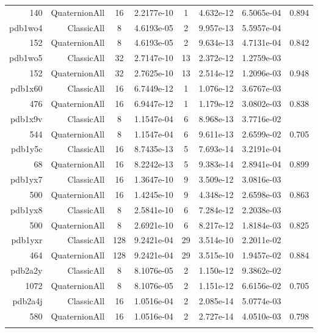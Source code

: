 \begin{xltabular}{\textwidth}{r|rcS[table-format=1.4e+2]cS[table-format=1.3e+2]S[table-format=1.4e+2]S[table-format=-1.3]}
140 & QuaternionAll & 16 & 2.2177e-10 & 1 & 4.632e-12 & 6.5065e-04 & 0.894\\  \addlinespace
pdb1wo4 & ClassicAll & 8 & 4.6193e-05 & 2 & 9.957e-13 & 5.5957e-04 & \\
152 & QuaternionAll & 8 & 4.6193e-05 & 2 & 9.634e-13 & 4.7131e-04 & 0.842\\  \addlinespace
pdb1wo5 & ClassicAll & 32 & 2.7147e-10 & 13 & 2.372e-12 & 1.2759e-03 & \\
152 & QuaternionAll & 32 & 2.7625e-10 & 13 & 2.514e-12 & 1.2096e-03 & 0.948\\  \addlinespace
pdb1x60 & ClassicAll & 16 & 6.7449e-12 & 1 & 1.076e-12 & 3.6767e-03 & \\
476 & QuaternionAll & 16 & 6.9447e-12 & 1 & 1.179e-12 & 3.0802e-03 & 0.838\\  \addlinespace
{\color{red} pdb1x9v } & ClassicAll & 8 & 1.1547e-04 & 6 & 8.968e-13 & 3.7716e-02 & \\
544 & QuaternionAll & 8 & 1.1547e-04 & 6 & 9.611e-13 & 2.6599e-02 & 0.705\\  \addlinespace
pdb1y5c & ClassicAll & 16 & 8.7435e-13 & 5 & 7.693e-14 & 3.2191e-04 & \\
68 & QuaternionAll & 16 & 8.2242e-13 & 5 & 9.383e-14 & 2.8941e-04 & 0.899\\  \addlinespace
pdb1yx7 & ClassicAll & 16 & 1.3647e-10 & 9 & 3.509e-12 & 3.0816e-03 & \\
500 & QuaternionAll & 16 & 1.4245e-10 & 9 & 4.348e-12 & 2.6598e-03 & 0.863\\  \addlinespace
pdb1yx8 & ClassicAll & 8 & 2.5841e-10 & 6 & 7.284e-12 & 2.2038e-03 & \\
500 & QuaternionAll & 8 & 2.6921e-10 & 6 & 8.217e-12 & 1.8184e-03 & 0.825\\  \addlinespace
pdb1yxr & ClassicAll & 128 & 9.2421e-04 & 29 & 3.514e-10 & 2.2011e-02 & \\
464 & QuaternionAll & 128 & 9.2421e-04 & 29 & 3.515e-10 & 1.9457e-02 & 0.884\\  \addlinespace
{\color{red} pdb2a2y } & ClassicAll & 8 & 8.1076e-05 & 2 & 1.150e-12 & 9.3862e-02 & \\
1072 & QuaternionAll & 8 & 8.1076e-05 & 2 & 1.151e-12 & 6.6156e-02 & 0.705\\  \addlinespace
pdb2a4j & ClassicAll & 16 & 1.0516e-04 & 2 & 2.085e-14 & 5.0774e-03 & \\
580 & QuaternionAll & 16 & 1.0516e-04 & 2 & 2.727e-14 & 4.0510e-03 & 0.798\\  \addlinespace

\end{xltabular}

